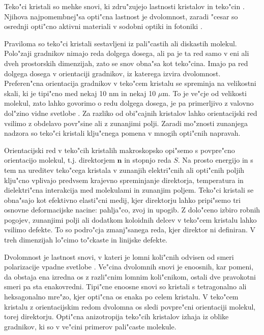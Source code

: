 \documentclass[12pt,twoside,openright,final]{report}
\begin{document}
Teko"ci kristali so mehke snovi, ki zdru"zujejo lastnosti kristalov in teko"cin \cite{degennes}. 
Njihova najpomembnej"sa opti"cna lastnost je dvolomnost, zaradi "cesar so osrednji opti"cno aktivni materiali v sodobni optiki in fotoniki \cite{optics-lcd}.

Praviloma so teko"ci kristali sestavljeni iz pali"castih ali diskastih molekul. 
Polo"zaji gradnikov nimajo reda dolgega dosega, ali pa je ta red samo v eni ali dveh prostorskih dimenzijah, zato se snov obna"sa kot teko"cina. 
Imajo pa red dolgega dosega v orientaciji gradnikov, iz katerega izvira dvolomnost. 
Preferen"cna orientacija gradnikov v teko"cem kristalu se spreminja na velikostni skali, ki je tipi"cno med nekaj 10 nm in nekaj 10 $\mu$m.
To je ve"cje od velikosti molekul, zato lahko govorimo o redu dolgega dosega, je pa primerljivo z valovno dol"zino vidne svetlobe \cite{kleman}. 
Za razliko od obi"cajnih kristalov lahko orientacijski red vsilimo z obdelavo povr"sine ali z zunanjimi polji. 
Zaradi mo"znosti zunanjega nadzora so teko"ci kristali klju"cnega pomena v mnogih opti"cnih napravah. 

Orientacijski red v teko"cih kristalih makroskopsko opi"semo s povpre"cno orientacijo molekul, t.j. direktorjem $\mathbf{n}$ in stopnjo reda $S$. 
Na prosto energijo in s tem na ureditev teko"cega kristala v zunanjih elektri"cnih ali opti"cnih poljih klju"cno vplivajo predvsem krajevno spreminjanje direktorja, temperatura in dielektri"cna interakcija med molekulami in zunanjim poljem. 
Teko"ci kristali se obna"sajo kot efektivno elasti"cni medij, kjer direktorju lahko pripi"semo tri osnovne deformacijske nacine: pahlja"co, zvoj in upogib.
Z dolo"ceno izbiro robnih pogojev, zunanjimi polji ali dodatkom koloidnih delcev v teko"cem kristalu lahko vsilimo defekte. 
To so podro"cja zmanj"sanega reda, kjer direktor ni definiran. 
V treh dimenzijah lo"cimo to"ckaste in linijske defekte. 

Dvolomnost je lastnost snovi, v kateri je lomni koli"cnih odvisen od smeri polarizacije vpadne svetlobe \cite{landau-lifsic-optics}. 
Ve"cina dvolomnih snovi je enoosnih, kar pomeni, da obstaja ena izredna os z razli"cnim lomnim koli"cnikom, ostali dve pravokotni smeri pa sta enakovredni. 
Tipi"cne enoosne snovi so kristali s tetragonalno ali heksagonalno mre"zo, kjer opti"cna os enaka po celem kristalu. 
V teko"cem kristalu z orientacijskim redom dvolomna os sledi povpre"cni orientaciji molekul, torej direktorju.
Opti"cna anizotropija teko"cih kristalov izhaja iz oblike gradnikov, ki so v ve"cini primerov pali"caste molekule. 
\end{document}
